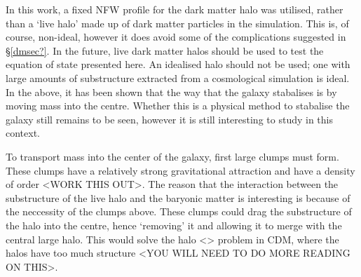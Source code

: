 In this work, a fixed NFW profile for the dark matter halo was utilised, rather than a `live halo' made up of dark matter particles in the simulation.
This is, of course, non-ideal, however it does avoid some of the complications suggested in \S \ref{dmsec?}.
In the future, live dark matter halos should be used to test the equation of state presented here.
An idealised halo should not be used; one with large amounts of substructure extracted from a cosmological simulation is ideal.
In the above, it has been shown that the way that the galaxy stabalises is by moving mass into the centre.
Whether this is a physical method to stabalise the galaxy still remains to be seen, however it is still interesting to study in this context.

To transport mass into the center of the galaxy, first large clumps must form.
These clumps have a relatively strong gravitational attraction and have a density of order <WORK THIS OUT>.
The reason that the interaction between the substructure of the live halo and the baryonic matter is interesting is because of the neccessity of the clumps above.
These clumps could drag the substructure of the halo into the centre, hence `removing' it and allowing it to merge with the central large halo.
This would solve the halo <> problem in CDM, where the halos have too much structure <YOU WILL NEED TO DO MORE READING ON THIS>.
